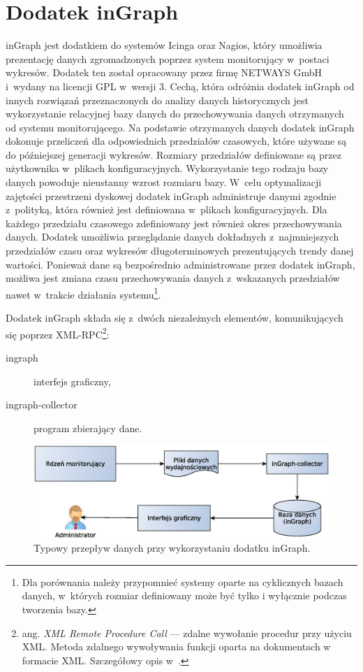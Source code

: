 \section[Dodatek inGraph][Dodatek inGraph]{Dodatek inGraph}
\label{sec:inGraph}

inGraph jest dodatkiem do systemów Icinga oraz Nagios, który umożliwia
prezentację danych zgromadzonych poprzez system monitorujący w~postaci
wykresów. Dodatek ten został opracowany przez firmę NETWAYS GmbH
i~wydany na licencji GPL w~wersji 3. Cechą, która odróżnia dodatek
inGraph od innych rozwiązań przeznaczonych do analizy danych
historycznych jest wykorzystanie relacyjnej bazy danych do
przechowywania danych otrzymanych od systemu monitorującego. Na
podstawie otrzymanych danych dodatek inGraph dokonuje przeliczeń dla
odpowiednich przedziałów czasowych, które używane są do późniejszej
generacji wykresów. Rozmiary przedziałów definiowane są przez
użytkownika w~plikach konfiguracyjnych. Wykorzystanie tego rodzaju
bazy danych powoduje nieustanny wzrost rozmiaru bazy. W~celu
optymalizacji zajętości przestrzeni dyskowej dodatek inGraph
administruje danymi zgodnie z~polityką, która również jest definiowana
w~plikach konfiguracyjnych. Dla każdego przedziału czasowego
zdefiniowany jest również okres przechowywania danych. Dodatek
umożliwia przeglądanie danych dokładnych z~najmniejszych przedziałów
czasu oraz wykresów długoterminowych prezentujących trendy danej
wartości. Ponieważ dane są bezpośrednio administrowane przez dodatek
inGraph, możliwa jest zmiana czasu przechowywania danych z~wskazanych
przedziałów nawet w~trakcie działania systemu\footnote{Dla porównania
  należy przypomnieć systemy oparte na cyklicznych bazach danych,
  w~których rozmiar definiowany może być tylko i wyłącznie podczas
  tworzenia bazy.}.

Dodatek inGraph składa się z~dwóch niezależnych elementów,
komunikujących się poprzez XML-RPC\footnote{ang. {\em XML Remote
    Procedure Call} --- zdalne wywołanie procedur przy użyciu
  XML. Metoda zdalnego wywoływania funkcji oparta na dokumentach w
  formacie XML. Szczegółowy opis w~\cite{www:XMLRPC}.}:

\begin{description}
\item[ingraph] interfejs graficzny,
\item[ingraph-collector] program zbierający dane.
\end{description}

\begin{figure}[ht]
  \caption{Typowy przepływ danych przy wykorzystaniu dodatku inGraph.}
  \label{fig:inGraphFlow}
\includegraphics[width=1\textwidth]{img/ingraphFlow}
\end{figure}

